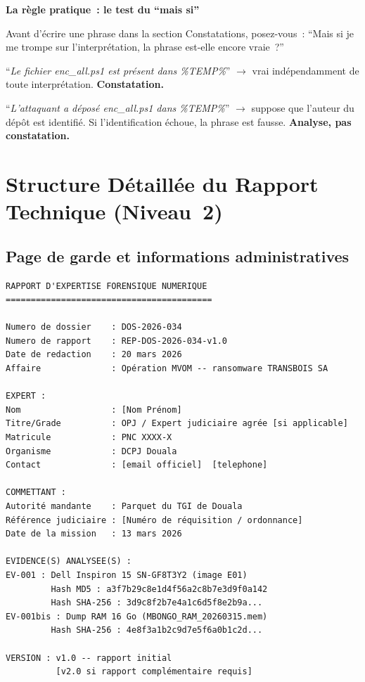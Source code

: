 \begin{boxalert}
\textbf{La règle pratique~: le test du ``mais si''}

Avant d'écrire une phrase dans la section Constatations, posez-vous~:
``Mais si je me trompe sur l'interprétation, la phrase est-elle
encore vraie~?''

``\textit{Le fichier enc\_all.ps1 est présent dans \%TEMP\%}''
$\to$ vrai indépendamment de toute interprétation. \textbf{Constatation.}

``\textit{L'attaquant a déposé enc\_all.ps1 dans \%TEMP\%}''
$\to$ suppose que l'auteur du dépôt est identifié. Si l'identification
échoue, la phrase est fausse. \textbf{Analyse, pas constatation.}
\end{boxalert}

\section{Structure Détaillée du Rapport Technique (Niveau~2)}
\label{sec:structure-rapport}

\subsection{Page de garde et informations administratives}

\begin{lstlisting}[language=bash_forensique,
    caption={Métadonnées obligatoires -- page de garde}]
RAPPORT D'EXPERTISE FORENSIQUE NUMERIQUE
=========================================

Numero de dossier    : DOS-2026-034
Numero de rapport    : REP-DOS-2026-034-v1.0
Date de redaction    : 20 mars 2026
Affaire              : Opération MVOM -- ransomware TRANSBOIS SA

EXPERT :
Nom                  : [Nom Prénom]
Titre/Grade          : OPJ / Expert judiciaire agrée [si applicable]
Matricule            : PNC XXXX-X
Organisme            : DCPJ Douala
Contact              : [email officiel]  [telephone]

COMMETTANT :
Autorité mandante    : Parquet du TGI de Douala
Référence judiciaire : [Numéro de réquisition / ordonnance]
Date de la mission   : 13 mars 2026

EVIDENCE(S) ANALYSEE(S) :
EV-001 : Dell Inspiron 15 SN-GF8T3Y2 (image E01)
         Hash MD5 : a3f7b29c8e1d4f56a2c8b7e3d9f0a142
         Hash SHA-256 : 3d9c8f2b7e4a1c6d5f8e2b9a...
EV-001bis : Dump RAM 16 Go (MBONGO_RAM_20260315.mem)
         Hash SHA-256 : 4e8f3a1b2c9d7e5f6a0b1c2d...

VERSION : v1.0 -- rapport initial
          [v2.0 si rapport complémentaire requis]
\end{lstlisting}

